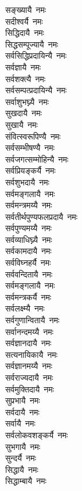 \begin{flushleft}
\begin{multicols}{2}
सङ्ख्यायै~नमः\\
सदीश्वर्यै~नमः\\
सिद्धिदायै~नमः\\
सिद्धसम्पूज्यायै~नमः\\
सर्वसिद्धिप्रदायिन्यै~नमः\\
सर्वज्ञायै~नमः\hfill{}\\
सर्वशक्त्यै~नमः\\
सर्वसम्पत्प्रदायिन्यै~नमः\\
सर्वाशुभघ्न्यै~नमः\\
सुखदायै~नमः\\
सुखायै~नमः\\
संवित्स्वरूपिण्यै~नमः\\
सर्वसम्भीषण्यै~नमः\\
सर्वजगत्सम्मोहिन्यै~नमः\\
सर्वप्रियङ्कर्यै~नमः\\
सर्वशुभदायै~नमः\hfill{}\\
सर्वमङ्गलायै~नमः\\
सर्वमन्त्रमय्यै~नमः\\
सर्वतीर्थपुण्यफलप्रदायै~नमः\\
सर्वपुण्यमय्यै~नमः\\
सर्वव्याधिघ्न्यै~नमः\\
सर्वकामदायै~नमः\\
सर्वविघ्नहर्यै~नमः\\
सर्ववन्दितायै~नमः\\
सर्वमङ्गलायै~नमः\\
सर्वमन्त्रकर्यै~नमः\hfill{}\\
सर्वलक्ष्म्यै~नमः\\
सर्वगुणान्वितायै~नमः\\
सर्वानन्दमय्यै~नमः\\
सर्वज्ञानदायै~नमः\\
सत्यनायिकायै~नमः\\
सर्वज्ञानमय्यै~नमः\\
सर्वराज्यदायै~नमः\\
सर्वमुक्तिदायै~नमः\\
सुप्रभायै~नमः\\
सर्वदायै~नमः\hfill{}\\
सर्वायै~नमः\\
सर्वलोकवशङ्कर्यै~नमः\\
सुभगायै~नमः\\
सुन्दर्यै~नमः\\
सिद्धायै~नमः\\
सिद्धाम्बायै~नमः\\

\end{multicols}
\end{flushleft}
